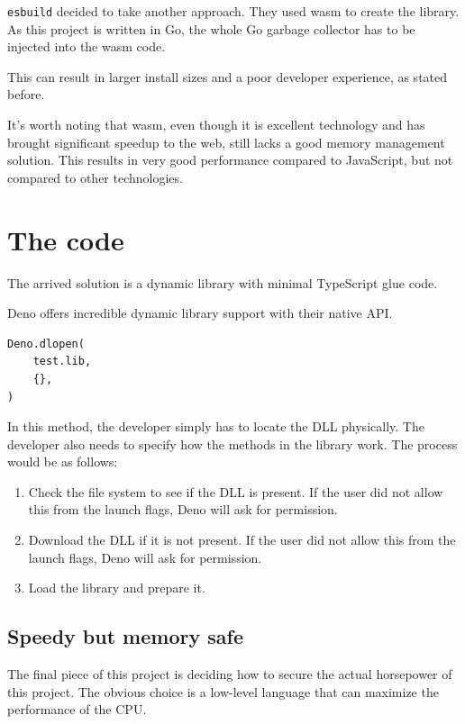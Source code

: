 \documentclass[12pt, letterpaper]{article}
\begin{document}
\begin{multicols}{2}
    \verb|esbuild| decided to take another approach. They used wasm \cite{WASM} to create the library. As this project is written in Go, the whole Go garbage collector has to be injected into the wasm code.

    This can result in larger install sizes and a poor developer experience, as stated before.

    It's worth noting that wasm, even though it is excellent technology and has brought significant speedup to the web, still lacks a good memory management solution. This results in very good performance compared to JavaScript, but not compared to other technologies.

    \section{The code}

    The arrived solution is a dynamic library with minimal TypeScript glue code.

    Deno offers incredible dynamic library support with their native API.

    \begin{lstlisting}
Deno.dlopen(
    test.lib,
    {},
)
    \end{lstlisting}

    In this method, the developer simply has to locate the DLL physically. The developer also needs to specify how the methods in the library work.
    The process would be as follows:

    \begin{enumerate}
        \item Check the file system to see if the DLL is present. If the user did not allow this from the launch flags, Deno will ask for permission.
        \item Download the DLL if it is not present. If the user did not allow this from the launch flags, Deno will ask for permission.
        \item Load the library and prepare it.
    \end{enumerate}


    \subsection{Speedy but memory safe}

    The final piece of this project is deciding how to secure the actual horsepower of this project. The obvious choice is a low-level language that can maximize the performance of the CPU.


\end{multicols}
\end{document}
